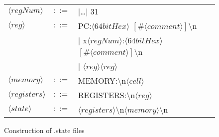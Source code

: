\begin{figure}
\begin{tabular}{l c >{\ttfamily}l}
        $\langle regNum     \rangle$ & $::=$ & 0 |\dots | 31                                                                                      \\
        $\langle reg        \rangle$ & $::=$ & PC:$\langle 64bitHex\rangle$ $[\#\langle comment\rangle]$\textbackslash n                          \\
                                     &       & | x$\langle regNum\rangle$:$\langle64bitHex\rangle$ $[\#\langle comment\rangle]$\textbackslash n   \\
                                     &       & | $\langle reg\rangle\langle reg\rangle$                                                           \\
        $\langle memory     \rangle$ & $::=$ & MEMORY:\textbackslash n$\langle cell\rangle$                                                       \\
        $\langle registers  \rangle$ & $::=$ & REGISTERS:\textbackslash n$\langle reg\rangle$                                                     \\
        $\langle state      \rangle$ & $::=$ & $\langle registers\rangle$\textbackslash n$\langle memory\rangle$\textbackslash n                  \\

    \end{tabular}
    \caption[Construction of .state files]{Construction of .state files}
    \label{statefileform}
\end{figure}